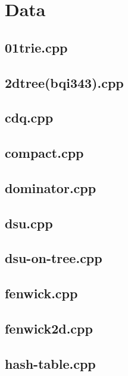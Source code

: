 \section{Data}

\subsection{01trie.cpp}


\subsection{2dtree(bqi343).cpp}


\subsection{cdq.cpp}


\subsection{compact.cpp}


\subsection{dominator.cpp}


\subsection{dsu.cpp}


\subsection{dsu-on-tree.cpp}


\subsection{fenwick.cpp}


\subsection{fenwick2d.cpp}


\subsection{hash-table.cpp}


